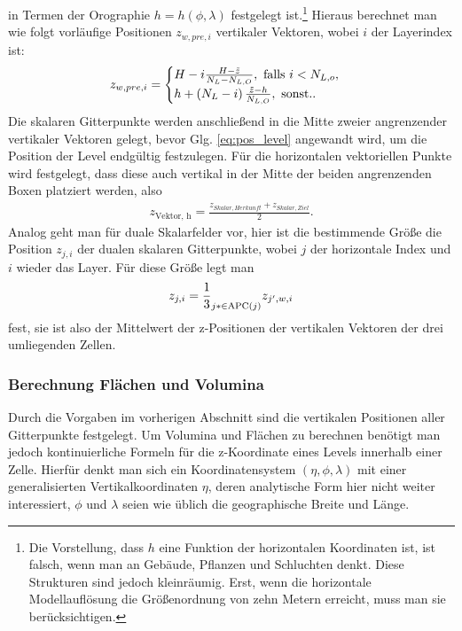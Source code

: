 \documentclass{book}
\newcommand\shifttilde[2]{\stackengine{\Sstackgap}{$#2$}{\(\hspace{#1}\tilde{}\)}{O}{l}{F}{T}{S}}
\newcommand\newtilde[1]{%
\if C#1\shifttilde{4.8 pt}{#1}\else
\if E#1\shifttilde{5.0 pt}{#1}\else
\if F#1\shifttilde{5.0 pt}{#1}\else
\if I#1\shifttilde{3.3 pt}{#1}\else
\if L#1\shifttilde{4.0 pt}{#1}\else
\if S#1\shifttilde{4.0 pt}{#1}\else
\if V#1\shifttilde{4.0 pt}{#1}\else
\if W#1\shifttilde{5.0 pt}{#1}\else
\if f#1\shifttilde{3.3 pt}{#1}\else
\if q#1\shifttilde{3.0 pt}{#1}\else
\if u#1\shifttilde{3.3 pt}{#1}\else
\if v#1\shifttilde{3.3 pt}{#1}\else
\if \psi#1\shifttilde{4.5 pt}{#1}\else
\tilde{#1}
\fi\fi\fi\fi\fi\fi\fi\fi\fi\fi\fi\fi\fi}
\let\sum\relax
\DeclareMathOperator*{\sum}{\raisebox{-3.5pt}{\scalebox{2}{\rotatebox{1}{{\bask Σ}}}}}
\begin{document}
%
in Termen der Orographie $h = h\left(\phi, \lambda\right)$ festgelegt ist.\footnote{Die Vorstellung, dass $h$ eine Funktion der horizontalen Koordinaten ist, ist falsch, wenn man an Gebäude, Pflanzen und Schluchten denkt. Diese Strukturen sind jedoch kleinräumig. Erst, wenn die horizontale Modellauflösung die Größenordnung von zehn Metern erreicht, muss man sie berücksichtigen.} Hieraus berechnet man wie folgt vorläufige Positionen $z_{w, pre, i}$ vertikaler Vektoren, wobei $i$ der Layerindex ist:
%
\begin{eqnarray}
z_{w, pre, i} = \begin{cases}
H - i\frac{H - \newtilde{z}}{N_L - N_{L, O}}, \text{ falls } i < N_{L, o},\\
h + \left(N_L - i\right)\frac{\newtilde{z} - h}{N_{L, O}}, \text{ sonst.}.
\end{cases}
\end{eqnarray}
%
Die skalaren Gitterpunkte werden anschließend in die Mitte zweier angrenzender vertikaler Vektoren gelegt, bevor Glg. \eqref{eq:pos_level} angewandt wird, um die Position der Level endgültig festzulegen. Für die horizontalen vektoriellen Punkte wird festgelegt, dass diese auch vertikal in der Mitte der beiden angrenzenden Boxen platziert werden, also
%
\begin{eqnarray}
z_\text{Vektor, h} = \frac{z_{Skalar, Herkunft} + z_{Skalar, Ziel}}{2}.
\end{eqnarray}
%
Analog geht man für duale Skalarfelder vor, hier ist die bestimmende Größe die Position $z_{j, i}$ der dualen skalaren Gitterpunkte, wobei $j$ der horizontale Index und $i$ wieder das Layer. Für diese Größe legt man
%
\begin{eqnarray}
z_{j, i} = \frac{1}{3}\sum_{j* \in \text{APC}(j)}z_{j', w, i}
\end{eqnarray}
% 
fest, sie ist also der Mittelwert der z-Positionen der vertikalen Vektoren der drei umliegenden Zellen.

\subsubsection{Berechnung Flächen und Volumina}
\label{sec:berechnung_von_flächen_und_volumina}

Durch die Vorgaben im vorherigen Abschnitt sind die vertikalen Positionen aller Gitterpunkte festgelegt. Um Volumina und Flächen zu berechnen benötigt man jedoch kontinuierliche Formeln für die z-Koordinate eines Levels innerhalb einer Zelle. Hierfür denkt man sich ein Koordinatensystem $\left(\eta, \phi, \lambda\right)$ mit einer generalisierten Vertikalkoordinaten $\eta$, deren analytische Form hier nicht weiter interessiert, $\phi$ und $\lambda$ seien wie üblich die geographische Breite und Länge.
\end{document}
